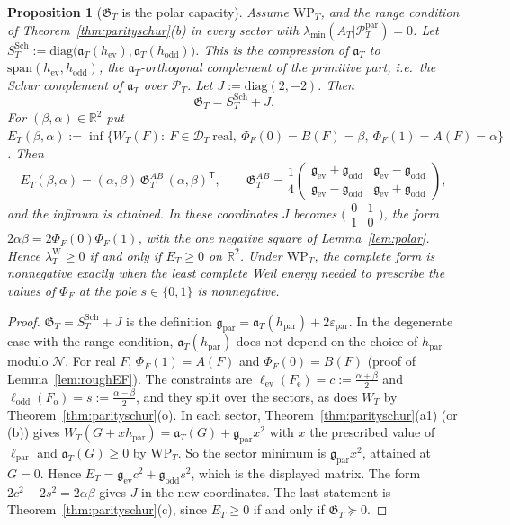\documentclass[11pt]{amsart}
\newtheorem{proposition}[theorem]{Proposition}
\theoremstyle{definition}
\theoremstyle{remark}
\newcommand{\R}{\mathbb R}
\newcommand{\PT}{\mathcal P_T}
\newcommand{\lamW}{\lambda^{\mathrm W}_T}
\begin{document}
\begin{proposition}[$\mathfrak G_T$ is the polar capacity]\label{prop:polarcap}
Assume $\mathrm{WP}_T$, and the range condition of Theorem~\ref{thm:parityschur}(b) in every
sector with $\lambda_{\min}(A_T|\PT^{\mathrm{par}})=0$. Let
$S^{\mathrm{Sch}}_T:=\mathrm{diag}\big(\mathfrak a_T(h_{\mathrm{ev}}),\mathfrak a_T(h_{\mathrm{odd}})\big)$. This is the compression of
$\mathfrak a_T$ to $\mathrm{span}(h_{\mathrm{ev}},h_{\mathrm{odd}})$, the $\mathfrak a_T$-orthogonal complement of the primitive part,
i.e.\ the Schur complement of $\mathfrak a_T$ over $\PT$. Let $J:=\mathrm{diag}(2,-2)$. Then
\[
\mathfrak G_T=S^{\mathrm{Sch}}_T+J .
\]
For $(\beta,\alpha)\in\R^2$ put
$E_T(\beta,\alpha):=\inf\{W_T(F):\ F\in\mathcal D_T\ \text{real},\ \Phi_F(0)=B(F)=\beta,\ \Phi_F(1)=A(F)=\alpha\}$. Then
\[
E_T(\beta,\alpha)=(\alpha,\beta)\,\mathfrak G^{AB}_T\,(\alpha,\beta)^{\mathsf T},\qquad
\mathfrak G^{AB}_T=\frac14\begin{pmatrix}\mathfrak g_{\mathrm{ev}}+\mathfrak g_{\mathrm{odd}}&\mathfrak g_{\mathrm{ev}}-\mathfrak g_{\mathrm{odd}}\\
\mathfrak g_{\mathrm{ev}}-\mathfrak g_{\mathrm{odd}}&\mathfrak g_{\mathrm{ev}}+\mathfrak g_{\mathrm{odd}}\end{pmatrix},
\]
and the infimum is attained. In these coordinates $J$ becomes $\big(\begin{smallmatrix}0&1\\1&0\end{smallmatrix}\big)$,
the form $2\alpha\beta=2\Phi_F(0)\Phi_F(1)$, with the one negative square of Lemma~\ref{lem:polar}. Hence
$\lamW\ge0$ if and only if $E_T\ge0$ on $\R^2$. Under $\mathrm{WP}_T$, the complete form is nonnegative
exactly when the least complete Weil energy needed to prescribe the values of $\Phi_F$ at the pole
$s\in\{0,1\}$ is nonnegative.
\end{proposition}
\begin{proof}
$\mathfrak G_T=S^{\mathrm{Sch}}_T+J$ is the definition $\mathfrak g_{\mathrm{par}}=\mathfrak a_T(h_{\mathrm{par}})+2\varepsilon_{\mathrm{par}}$. In the
degenerate case with the range condition, $\mathfrak a_T(h_{\mathrm{par}})$ does not depend on the choice of $h_{\mathrm{par}}$
modulo $\mathcal N$. For real $F$, $\Phi_F(1)=A(F)$ and $\Phi_F(0)=B(F)$ (proof of Lemma~\ref{lem:roughEF}). The
constraints are $\ell_{\mathrm{ev}}(F_{\mathrm e})=c:=\frac{\alpha+\beta}2$ and $\ell_{\mathrm{odd}}(F_{\mathrm o})=s:=\frac{\alpha-\beta}2$,
and they split over the sectors, as does $W_T$ by Theorem~\ref{thm:parityschur}(o). In each sector,
Theorem~\ref{thm:parityschur}(a1) (or (b)) gives $W_T(G+xh_{\mathrm{par}})=\mathfrak a_T(G)+\mathfrak g_{\mathrm{par}}x^2$ with $x$ the
prescribed value of $\ell_{\mathrm{par}}$ and $\mathfrak a_T(G)\ge0$ by $\mathrm{WP}_T$. So the sector minimum is
$\mathfrak g_{\mathrm{par}}x^2$, attained at $G=0$. Hence $E_T=\mathfrak g_{\mathrm{ev}}c^2+\mathfrak g_{\mathrm{odd}}s^2$, which is the displayed
matrix. The form $2c^2-2s^2=2\alpha\beta$ gives $J$ in the new coordinates. The last statement is
Theorem~\ref{thm:parityschur}(c), since $E_T\ge0$ if and only if $\mathfrak G_T\succeq0$.
\end{proof}
\end{document}
